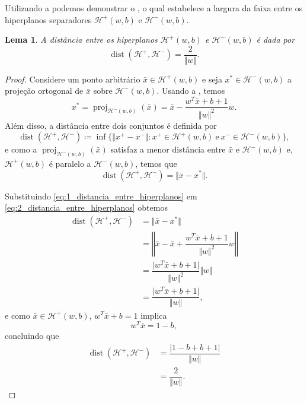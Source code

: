 \documentclass[12pt,a4paper]{scrartcl}
\DeclareMathOperator{\proj}{proj}
\DeclareMathOperator{\dist}{dist}
\def\Hset{\mathcal{H}}
\def\xbar{\bar{x}}
\newtheorem{lema}{Lema}
\theoremstyle{definition}%
\begin{document}
Utilizando a  podemos demonstrar o , o qual estabelece a largura da faixa entre os hiperplanos separadores $\Hset^{+} (w,b)$ e $\Hset^{-} (w,b)$.

\begin{lema} \label{lema:distancia_entre_hiperplanos} 
A distância entre os hiperplanos $\Hset^{+} (w,b)$ e $\Hset^{-} (w,b)$ é dada por 
\[
\dist(\Hset^{+}, \Hset^{-})=\dfrac{2}{\Vert w\Vert}.
\] 
\end{lema}
\begin{proof}
Considere um ponto arbitrário $\xbar\in \Hset^{+} (w,b)$ e seja $x^{*}\in \Hset^{-} (w,b)$ a projeção ortogonal de $\xbar$ sobre $\Hset^{-} (w,b)$. Usando a , temos
\[ \label{eq:1_distancia_entre_hiperplanos} 
x^{*}= \proj_{\Hset^{-} (w,b)}(\xbar)= \xbar - \dfrac{w^{T}\xbar+b+1}{\Vert w\Vert^{2}}w. 
\] 
Além disso, a distância entre dois conjuntos é definida por
\[ 
\dist(\Hset^{+}, \Hset^{-}) \coloneqq  \inf\{\Vert x^{+}-x^{-} \Vert : x^{+}\in \Hset^{+} (w,b)\ \text{e} \ x^{-}\in \Hset^{-} (w,b) \},
\]
e como a $\proj_{\Hset^{-} (w,b)}(\xbar)$ satisfaz a menor distância entre $\xbar$ e $\Hset^{-} (w,b)$ e, $\Hset^{+} (w,b)$ é paralelo a $\Hset^{-} (w,b)$, temos que 
\[ \label{eq:2_distancia_entre_hiperplanos} 
\dist(\Hset^{+},\Hset^{-})=\Vert \xbar-x^{*}\Vert. 
\]

Substituindo \eqref{eq:1_distancia_entre_hiperplanos} em \eqref{eq:2_distancia_entre_hiperplanos} obtemos
\begin{align} 
\dist(\Hset^{+},\Hset^{-}) &= \Vert \xbar-x^{*}\Vert \\
&= \left\Vert \xbar -\xbar +\dfrac{w^{T}\xbar+b+1}{\Vert w\Vert^{2}}w \right\Vert \\
&=  \dfrac{\vert w^{T}\xbar+b+1 \vert}{\Vert w\Vert^{2}} \Vert w\Vert \\
&= \dfrac{\vert w^{T}\xbar+b+1 \vert}{\Vert w\Vert},
\end{align}
e como $\xbar\in \Hset^{+} (w,b)$,  $ w^{T}\xbar+b=1$ implica
\[  w^{T}\xbar =1-b, \]
concluindo que 
\begin{align} 
\dist(\Hset^{+},\Hset^{-})&= \dfrac{\vert 1-b+b+1 \vert}{\Vert w\Vert} \\
&= \dfrac{2}{\Vert w\Vert }. 
\end{align}
\end{proof}


\end{document}
